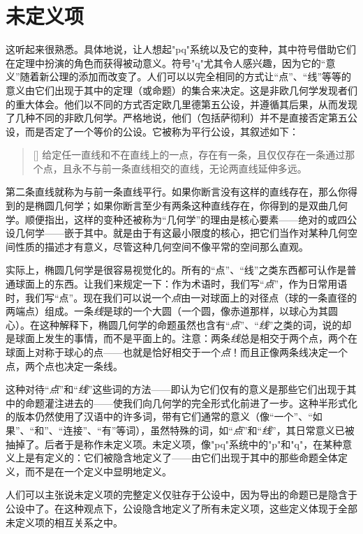 \section{未定义项}

这听起来很熟悉。具体地说，让人想起"pq"系统以及它的变种，其中符号借助它们在定理中扮演的角色而获得被动意义。符号"q"尤其令人感兴趣，因为它的“意义”随着新公理的添加而改变了。人们可以以完全相同的方式让“点”、“线”等等的意义由它们出现于其中的定理（或命题）的集合来决定。这是非欧几何学发现者们的重大体会。他们以不同的方式否定欧几里德第五公设，并遵循其后果，从而发现了几种不同的非欧几何学。严格地说，他们（包括萨彻利）并不是直接否定第五公设，而是否定了一个等价的公设。它被称为平行公设，其叙述如下：

\begin{quote}[]
给定任一直线和不在直线上的一点，存在有一条，且仅仅存在一条通过那个点，且永不与前一条直线相交的直线，无论两直线延伸多远。
\end{quote}

第二条直线就称为与前一条直线平行。如果你断言没有这样的直线存在，那么你得到的是椭圆几何学；如果你断言至少有两条这种直线存在，你得到的是双曲几何学。顺便指出，这样的变种还被称为“几何学”的理由是核心要素——绝对的或四公设几何学——嵌于其中。就是由于有这最小限度的核心，把它们当作对某种几何空间性质的描述才有意义，尽管这种几何空间不像平常的空间那么直观。

实际上，椭圆几何学是很容易视觉化的。所有的“点”、“线”之类东西都可认作是普通球面上的东西。让我们来规定一下：作为术语时，我们写“\emph{点}”，作为日常用语时，我们写“点”。现在我们可以说一个\emph{点}由一对球面上的对径点（球的一条直径的两端点）组成。一条\emph{线}是球的一个大圆（一个圆，像赤道那样，以球心为其圆心）。在这种解释下，椭圆几何学的命题虽然也含有“\emph{点}”、“\emph{线}”之类的词，说的却是球面上发生的事情，而不是平面上的。注意：两条\emph{线}总是相交于两个点，两个在球面上对称于球心的点——也就是恰好相交于一个\emph{点}！而且正像两条线决定一个点，两个点也决定一条线。

这种对待“\emph{点}”和“\emph{线}”这些词的方法——即认为它们仅有的意义是那些它们出现于其中的命题灌注进去的——使我们向几何学的完全形式化前进了一步。这种半形式化的版本仍然使用了汉语中的许多词，带有它们通常的意义（像“一个”、“如果”、“和”、“连接”、“有”等词），虽然特殊的词，如“\emph{点}”和“\emph{线}”，其日常意义已被抽掉了。后者于是称作未定义项。未定义项，像"pq"系统中的"p"和"q"，在某种意义上是有定义的：它们被隐含地定义了——由它们出现于其中的那些命题全体定义，而不是在一个定义中显明地定义。

人们可以主张说未定义项的完整定义仅驻存于公设中，因为导出的命题已是隐含于公设中了。在这种观点下，公设隐含地定义了所有未定义项，这些定义体现于全部未定义项的相互关系之中。

